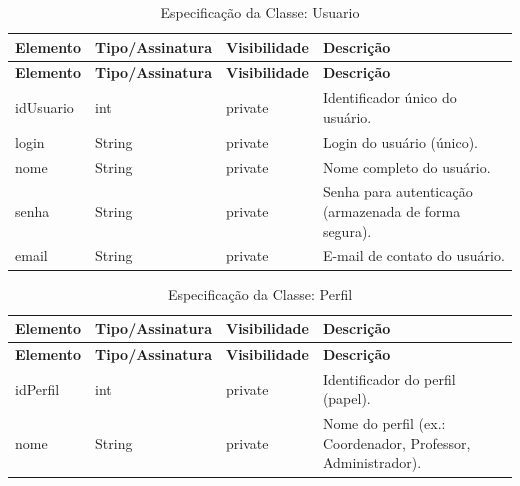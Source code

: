 \fonteautores

\vspace{\baselineskip}

\Needspace{0.32\textheight}
\begin{longtable}{|L{3.5cm}|L{3.5cm}|L{3.5cm}|L{3.5cm}|}
\caption{Especificação da Classe: Usuario} \\
\hline
\textbf{Elemento} & \textbf{Tipo/Assinatura} & \textbf{Visibilidade} & \textbf{Descrição} \\
\hline
\endfirsthead
\hline
\textbf{Elemento} & \textbf{Tipo/Assinatura} & \textbf{Visibilidade} & \textbf{Descrição} \\
\hline
\endhead
idUsuario & int & private & Identificador único do usuário. \\
\hline
login & String & private & Login do usuário (único). \\
\hline
nome & String & private & Nome completo do usuário. \\
\hline
senha & String & private & Senha para autenticação (armazenada de forma segura). \\
\hline
email & String & private & E-mail de contato do usuário. \\
\hline
\end{longtable}

\fonteautores

\vspace{\baselineskip}

\Needspace{0.32\textheight}
\begin{longtable}{|L{3.5cm}|L{3.5cm}|L{3.5cm}|L{3.5cm}|}
\caption{Especificação da Classe: Perfil} \\
\hline
\textbf{Elemento} & \textbf{Tipo/Assinatura} & \textbf{Visibilidade} & \textbf{Descrição} \\
\hline
\endfirsthead
\hline
\textbf{Elemento} & \textbf{Tipo/Assinatura} & \textbf{Visibilidade} & \textbf{Descrição} \\
\hline
\endhead
idPerfil & int & private & Identificador do perfil (papel). \\
\hline
nome & String & private & Nome do perfil (ex.: Coordenador, Professor, Administrador). \\
\hline
\end{longtable}

\fonteautores

\vspace{\baselineskip}

